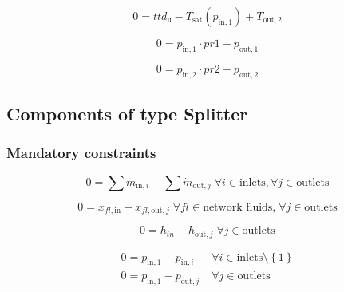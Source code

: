\documentclass[]{article}
\begin{document}
\begin{equation}
\label{eq:Condenser_ttd_u}
0=ttd_\mathrm{u}-T_\mathrm{sat}\left(p_\mathrm{in,1}\right) + T_\mathrm{out,2}
\end{equation}

\begin{equation}
\label{eq:Condenser_pr1}
0=p_\mathrm{in,1}\cdot pr1 - p_\mathrm{out,1}
\end{equation}

\begin{equation}
\label{eq:Condenser_pr2}
0=p_\mathrm{in,2}\cdot pr2 - p_\mathrm{out,2}
\end{equation}


\subsection{Components of type Splitter}

\subsubsection{Mandatory constraints}

\begin{equation}
\label{eq:Splitter_mass_flow_constraints}
0 =\sum\dot{m}_{\mathrm{in},i}-\sum\dot{m}_{\mathrm{out},j}\;\forall i \in \text{inlets}, \forall j \in \text{outlets}
\end{equation}

\begin{equation}
\label{eq:Splitter_fluid_constraints}
0 = x_{fl\mathrm{,in}} - x_{fl\mathrm{,out,}j}\; \forall fl \in \text{network fluids,} \; \forall j \in\text{outlets}
\end{equation}

\begin{equation}
\label{eq:Splitter_energy_balance_constraints}
0=h_{in}-h_{\mathrm{out,}j}\;\forall j \in\text{outlets}
\end{equation}

\begin{equation}
\label{eq:Splitter_pressure_constraints}
\begin{split}
0 = p_\mathrm{in,1} - p_{\mathrm{in,}i} & \; \forall i \in \text{inlets} \setminus \left\lbrace 1\right\rbrace\\
0 = p_\mathrm{in,1} - p_{\mathrm{out,}j} & \; \forall j \in \text{outlets}\\
\end{split}
\end{equation}
\end{document}
